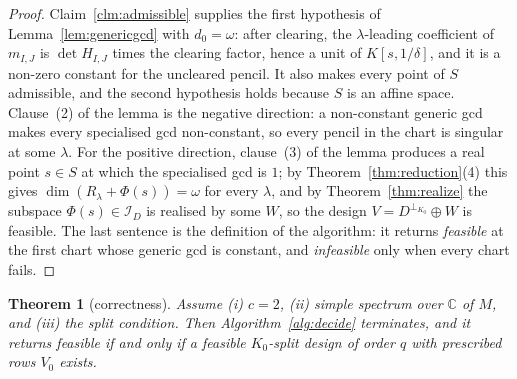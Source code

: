 \documentclass[journal]{IEEEtran}
\theoremstyle{plainn}
\newtheorem{thm}{Theorem}
\theoremstyle{remark}
\begin{document}
\begin{proof}
Claim~\ref{clm:admissible} supplies the first hypothesis of Lemma~\ref{lem:genericgcd} with $d_0=\omega$:
after clearing, the $\lambda$-leading coefficient of $m_{I,J}$ is $\det H_{I,J}$ times the clearing factor,
hence a unit of $K[s,1/\delta]$, and it is a non-zero constant for the uncleared pencil. It also makes
every point of $S$ admissible, and the second hypothesis holds because $S$ is an affine space. Clause~(2) of the lemma is the
negative direction: a non-constant generic gcd makes every specialised gcd non-constant, so every pencil in
the chart is singular at some $\lambda$. For the positive direction, clause~(3) of the lemma produces a real
point $s\in S$ at which the specialised gcd is $1$; by Theorem~\ref{thm:reduction}(4) this gives
$\dim(R_\lambda+\Phi(s))=\omega$ for every $\lambda$, and by Theorem~\ref{thm:realize} the subspace
$\Phi(s)\in\mathcal I_D$ is realised by some $W$, so the design $V=D^{\perp_{K_0}}\oplus W$ is feasible. The
last sentence is the definition of the algorithm: it returns \emph{feasible} at the first chart whose generic
gcd is constant, and \emph{infeasible} only when every chart fails.
\end{proof}

\begin{thm}[correctness]\label{thm:correct}
Assume (i) $c=2$, (ii) simple spectrum over $\mathbb C$ of $M$, and (iii) the split condition. Then
Algorithm~\ref{alg:decide} terminates,
and it returns \emph{feasible} if and only if a feasible $K_0$-split design of order $q$ with prescribed rows
$V_0$ exists.
\end{thm}
\end{document}
